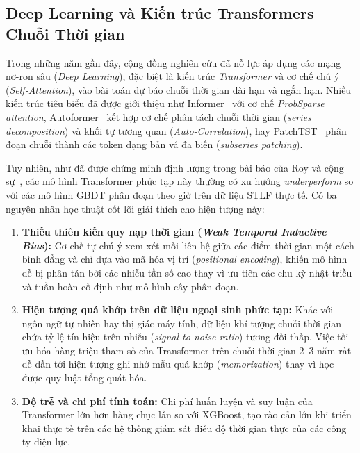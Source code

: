 \subsection{Deep Learning và Kiến trúc Transformers Chuỗi Thời gian}
Trong những năm gần đây, cộng đồng nghiên cứu đã nỗ lực áp dụng các mạng nơ-ron sâu (\textit{Deep Learning}), đặc biệt là kiến trúc \textit{Transformer} và cơ chế chú ý (\textit{Self-Attention}), vào bài toán dự báo chuỗi thời gian dài hạn và ngắn hạn. Nhiều kiến trúc tiêu biểu đã được giới thiệu như Informer~\cite{zhou2021informer} với cơ chế \textit{ProbSparse attention}, Autoformer~\cite{wu2021autoformer} kết hợp cơ chế phân tách chuỗi thời gian (\textit{series decomposition}) và khối tự tương quan (\textit{Auto-Correlation}), hay PatchTST~\cite{nie2023time} phân đoạn chuỗi thành các token dạng bản vá đa biến (\textit{subseries patching}).

Tuy nhiên, như đã được chứng minh định lượng trong bài báo của Roy và cộng sự~\cite{roy2025hourly}, các mô hình Transformer phức tạp này thường có xu hướng \textit{underperform} so với các mô hình GBDT phân đoạn theo giờ trên dữ liệu STLF thực tế. Có ba nguyên nhân học thuật cốt lõi giải thích cho hiện tượng này:
\begin{enumerate}
    \item \textbf{Thiếu thiên kiến quy nạp thời gian (\textit{Weak Temporal Inductive Bias}):} Cơ chế tự chú ý xem xét mối liên hệ giữa các điểm thời gian một cách bình đẳng và chỉ dựa vào mã hóa vị trí (\textit{positional encoding}), khiến mô hình dễ bị phân tán bởi các nhiễu tần số cao thay vì ưu tiên các chu kỳ nhật triều và tuần hoàn cố định như mô hình cây phân đoạn.
    \item \textbf{Hiện tượng quá khớp trên dữ liệu ngoại sinh phức tạp:} Khác với ngôn ngữ tự nhiên hay thị giác máy tính, dữ liệu khí tượng chuỗi thời gian chứa tỷ lệ tín hiệu trên nhiễu (\textit{signal-to-noise ratio}) tương đối thấp. Việc tối ưu hóa hàng triệu tham số của Transformer trên chuỗi thời gian 2--3 năm rất dễ dẫn tới hiện tượng ghi nhớ mẫu quá khớp (\textit{memorization}) thay vì học được quy luật tổng quát hóa.
    \item \textbf{Độ trễ và chi phí tính toán:} Chi phí huấn luyện và suy luận của Transformer lớn hơn hàng chục lần so với XGBoost, tạo rào cản lớn khi triển khai thực tế trên các hệ thống giám sát điều độ thời gian thực của các công ty điện lực.
\end{enumerate}

